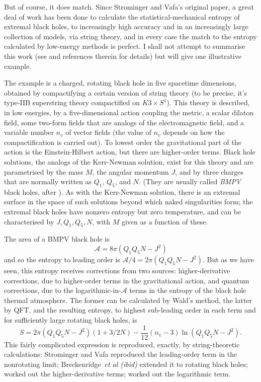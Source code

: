 \documentclass{article}
\newcommand{\mc}[1]{\ensuremath{\mathcal{#1}}}
\newcommand{\be}{\begin{equation}}
\newcommand{\ee}{\end{equation}}
\begin{document}
But of course, it does match. Since Strominger and Vafa's original paper, a great deal of work has been done to calculate the statistical-mechanical entropy of extremal black holes, to increasingly high accuracy and in an increasingly large collection of models, via string theory, and in every case the match to the entropy calculated by low-energy methods is perfect. I shall not attempt to summarise this work (see  and references therein for details) but will give one illustrative example.

The example is a charged, rotating black hole in five spacetime dimensions, obtained by compactifying a certain version of string theory (to be precise, it's type-IIB superstring theory compactified on $K3\times S^1$). This theory is described, in low energies, by a five-dimensional action coupling the metric, a scalar dilaton field, some two-form fields that are analogs of the electromagnetic field, and a variable number $n_v$ of vector fields (the value of $n_v$ depends on how the compactification is carried out). To lowest order the gravitational part of the action is the Einstein-Hilbert action, but there are higher-order terms. Black hole solutions, the analogs of the Kerr-Newman solution, exist for this theory and are parametrised by the mass $M$, the angular momentum $J$, and by three charges that are normally written as $Q_1$, $Q_5$, and $N$. (They are usually called \emph{BMPV} black holes, after ). As with the Kerr-Newman solution, there is an extremal surface in the space of such solutions beyond which naked singularities form; the extremal black holes have nonzero entropy but zero temperature, and can be characterised by $J, Q_1, Q_5, N$, with $M$ given as a function of these.

The area of a BMPV black hole is 
\be
\mc{A}=8 \pi (Q_1Q_5N - J^2)
\ee
and so the entropy to leading order is $\mc{A}/4=2 \pi (Q_1Q_5N - J^2)$. But as we have seen, this entropy receives corrections from two sources: higher-derivative corrections, due to higher-order terms in the gravitational action, and quantum corrections, due to the logarithmic-in-\mc{A} terms in the entropy of the black hole thermal atmosphere. The former can be calculated by Wald's method, the latter by QFT, and the resulting entropy, to highest sub-leading order in each term and for sufficiently large rotating black holes, is
\be
S = 2 \pi (Q_1Q_5N - J^2) (1 + 3/2N) - \frac{1}{12} (n_v-3) \ln (Q_1 Q_5 N - J^2).
\ee
This fairly complicated expression is reproduced, exactly, by string-theoretic calculations: Strominger and Vafa reproduced the leading-order term in the nonrotating limit; Breckenridge~\emph{et al (ibid)} extended it to rotating black holes;  worked out the higher-derivative terms;  worked out the logarithmic term. 
\end{document}
